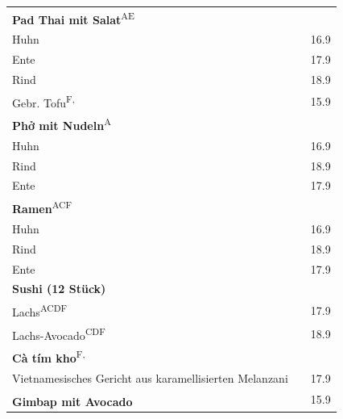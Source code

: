 \documentclass[a4paper,12pt]{article}
\newcommand{\vegan}{\textbf{\scriptsize \color{vegan}{Vegan}}}
\begin{document}
\begin{multicols}{2}
\begin{tabular}{Lrr}
\textbf{Pad Thai mit Salat}\textsuperscript{{\scriptsize AE}}\\
\hspace{0.4cm}Huhn & & 16.9\\
\hspace{0.4cm}Ente & & 17.9\\
\hspace{0.4cm}Rind & & 18.9\\
\hspace{0.4cm}Gebr. Tofu\textsuperscript{{\scriptsize F, \vegan}} & & 15.9\\
\textbf{Phở mit Nudeln}\textsuperscript{{\scriptsize A}}\\
\hspace{0.4cm}Huhn & & 16.9\\
\hspace{0.4cm}Rind & & 18.9\\
\hspace{0.4cm}Ente & & 17.9\\
\textbf{Ramen}\textsuperscript{{\scriptsize ACF}}\\
\hspace{0.4cm}Huhn & & 16.9\\
\hspace{0.4cm}Rind & & 18.9\\
\hspace{0.4cm}Ente & & 17.9\\
\textbf{Sushi (12 Stück)}\\
\hspace{0.4cm}Lachs\textsuperscript{{\scriptsize ACDF}} & & 17.9\\
\hspace{0.4cm}Lachs-Avocado\textsuperscript{{\scriptsize CDF}} & & 18.9\\
\textbf{Cà tím kho}\textsuperscript{{\scriptsize F, \vegan}}\\
\hspace{0.4cm}\scriptsize Vietnamesisches Gericht aus karamellisierten Melanzani & & 17.9\\
\textbf{Gimbap mit Avocado}\textsuperscript{{\scriptsize \vegan}} & & 15.9
\end{tabular}

\end{multicols}

\vfill
\end{document}
